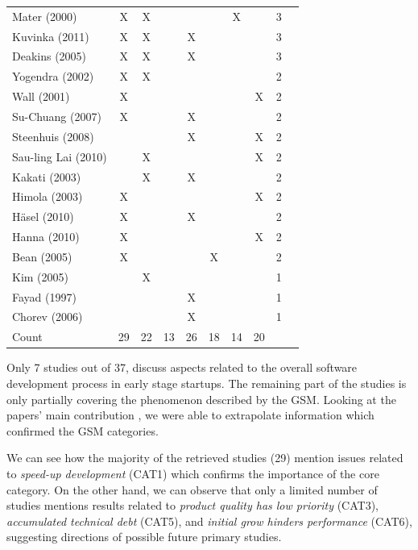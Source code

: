 \documentclass[10pt,journal,letterpaper,compsoc]{IEEEtran}
\begin{document}
\begin{table}[!t]
\begin{tabular}{|l||c||c||c||c||c||c||c||c||c|}
Mater (2000) & X & X & & & & X & & 3 & \cite{Mater2000} \\
Kuvinka (2011) & X & X & & X & & & & 3 & \cite{Kuvinka2011} \\
Deakins (2005) & X & X & & X & & & & 3 & \cite{Deakins2005} \\
Yogendra (2002) & X & X & & & & & & 2 & \cite{Yogendra2002} \\
Wall (2001) & X & & & & & & X & 2 & \cite{Wall2001} \\
Su-Chuang (2007) & X & & & X & & & & 2 & \cite{Su-Chan2007} \\
Steenhuis (2008) & & & & X & & & X & 2 & \cite{Steenhuis2008} \\
Sau-ling Lai (2010) & & X & & & & & X & 2 & \cite{Lai2010} \\
Kakati (2003) & & X & & X & & & & 2 & \cite{Kakati2003} \\
Himola (2003) & X & & & & & & X & 2 & \cite{Hilmola2003} \\
H\"{a}sel (2010) & X & & & X & & & & 2 & \cite{Hasel2010} \\
Hanna (2010) & X & & & & & & X & 2 & \cite{Hanna2010} \\
Bean (2005) & X & & & & X & & & 2 & \cite{Bean2005} \\
Kim (2005) & & X & & & & & & 1 & \cite{Kim2005} \\
Fayad (1997) & & & & X & & & & 1 & \cite{Fayad1997} \\
Chorev (2006) & & & & X & & & & 1 & \cite{Chorev2006} \\
\hline
Count & 29 & 22 & 13 & 26 & 18 & 14 & 20 & &\\
\hline
\end{tabular}
\end{table}

Only 7 studies out of 37, discuss aspects related to the overall software
development process in early stage startups. The remaining part of the studies
is only partially covering the phenomenon described by the GSM. Looking at the
papers' main contribution%
, we were able to extrapolate information which confirmed the GSM categories.

We can see how the majority of the retrieved studies (29) mention issues
related to \textit{speed-up development} (CAT1) which confirms the importance of
the core category. On the other hand, we can observe that only a limited number
of studies mentions results related to \textit{product quality has low priority}
(CAT3), \textit{accumulated technical debt} (CAT5), and \textit{initial grow
hinders performance} (CAT6), suggesting directions of possible future primary
studies.
\end{document}
